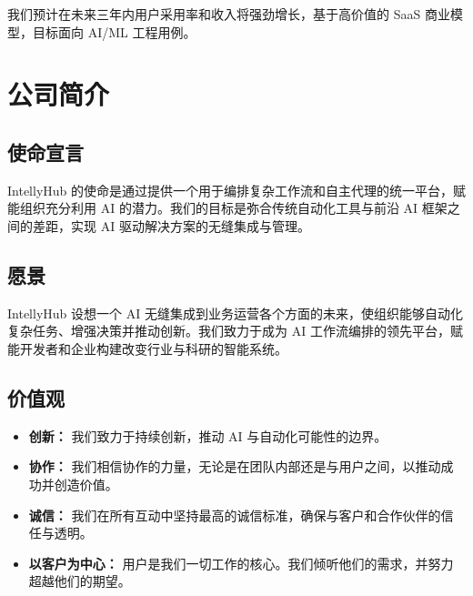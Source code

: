 \documentclass[11pt, a4paper, oneside]{article}
\begin{document}
我们预计在未来三年内用户采用率和收入将强劲增长，基于高价值的 SaaS 商业模型，目标面向 AI/ML 工程用例。

\section{公司简介}
\subsection{使命宣言}
IntellyHub 的使命是通过提供一个用于编排复杂工作流和自主代理的统一平台，赋能组织充分利用 AI 的潜力。我们的目标是弥合传统自动化工具与前沿 AI 框架之间的差距，实现 AI 驱动解决方案的无缝集成与管理。

\subsection{愿景}
IntellyHub 设想一个 AI 无缝集成到业务运营各个方面的未来，使组织能够自动化复杂任务、增强决策并推动创新。我们致力于成为 AI 工作流编排的领先平台，赋能开发者和企业构建改变行业与科研的智能系统。

\subsection{价值观}
\begin{itemize}
    \item \textbf{创新：} 我们致力于持续创新，推动 AI 与自动化可能性的边界。
    \item \textbf{协作：} 我们相信协作的力量，无论是在团队内部还是与用户之间，以推动成功并创造价值。
    \item \textbf{诚信：} 我们在所有互动中坚持最高的诚信标准，确保与客户和合作伙伴的信任与透明。
    \item \textbf{以客户为中心：} 用户是我们一切工作的核心。我们倾听他们的需求，并努力超越他们的期望。
\end{itemize}
\end{document}
